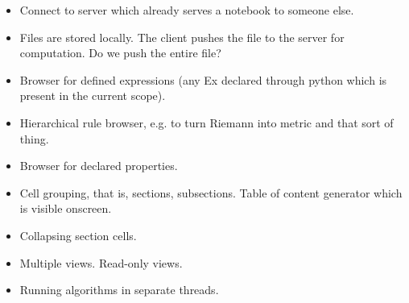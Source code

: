
\begin{itemize}

\item Connect to server which already serves a notebook to someone
  else.

\item Files are stored locally. The client pushes the file to the
  server for computation. Do we push the entire file?

\item Browser for defined expressions (any Ex declared through python
  which is present in the current scope).

\item Hierarchical rule browser, e.g. to turn Riemann into metric and
  that sort of thing.

\item Browser for declared properties.

\item Cell grouping, that is, sections, subsections. Table of content
  generator which is visible onscreen. 

\item Collapsing section cells.

\item Multiple views. Read-only views.

\item Running algorithms in separate threads.

\end{itemize}
